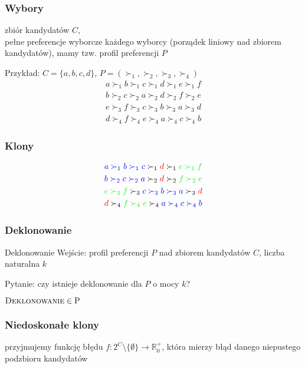 \documentclass{beamer}
\begin{document}
\begin{frame} \frametitle{Wybory}
  zbiór kandydatów $C$, \\ 
  pełne preferencje wyborcze każdego wyborcy (porządek liniowy nad zbiorem kandydatów), mamy tzw. profil preferencji $P$

	\vfill

	Przykład: $C = \{a, b, c, d\}$, $P = (\succ_1, \succ_2, \succ_3, \succ_4)$
   	\begin{align*}
		a \succ_1 b \succ_1 c \succ_1 d \succ_1 e \succ_1 f \\
		b \succ_2 c \succ_2 a \succ_2 d \succ_2 f \succ_2 e \\
		e \succ_3 f \succ_3 c \succ_3 b \succ_3 a \succ_3 d \\
		d \succ_4 f \succ_4 e \succ_4 a \succ_4 c \succ_4 b
	\end{align*}
\end{frame}

\begin{frame} \frametitle{Klony}
	\begin{align*}
		\textcolor{blue}{a \succ_1 b \succ_1 c} \succ_1 \textcolor{red}{d} \succ_1 \textcolor{green}{e \succ_1 f} \\
		\textcolor{blue}{b \succ_2 c \succ_2 a} \succ_2 \textcolor{red}{d} \succ_2 \textcolor{green}{f \succ_2 e} \\
		\textcolor{green}{e \succ_3 f} \succ_3 \textcolor{blue}{c \succ_3 b \succ_3 a} \succ_3 \textcolor{red}{d} \\
		\textcolor{red}{d} \succ_4 \textcolor{green}{f \succ_4 e} \succ_4 \textcolor{blue}{a \succ_4 c \succ_4 b}
	\end{align*}
\end{frame}

\begin{frame} \frametitle{Deklonowanie}
  \begin{aproblem}{Deklonowanie}
    Wejście: profil preferencji $P$ nad zbiorem kandydatów $C$, liczba naturalna $k$

    Pytanie: czy istnieje deklonowanie dla $P$ o mocy $k$?
  \end{aproblem}

  $\textsc{Deklonowanie} \in \text{P}$

\end{frame} 

\begin{frame} \frametitle{Niedoskonałe klony}
  przyjmujemy funkcję błędu $f: 2^C \setminus \{\emptyset\} \rightarrow \mathbb{R}_0^+$,
  która mierzy błąd danego niepustego podzbioru kandydatów 
\end{frame}
\end{document}
